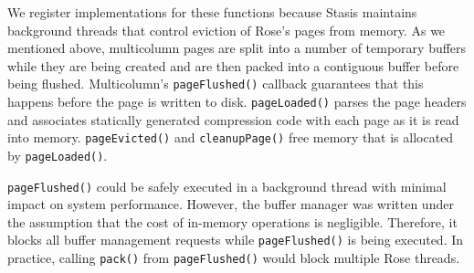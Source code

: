 \documentclass{vldb}
\newcommand{\rows}{Rose\xspace}
\newcommand{\rowss}{Rose's\xspace}
\begin{document}



We register implementations for these functions because
Stasis maintains background threads that control eviction
of \rowss pages from memory.  As we mentioned above, multicolumn pages
are split into a number of temporary buffers while they are being
created and are then packed into a contiguous buffer before being
flushed.  Multicolumn's {\tt pageFlushed()} callback guarantees
that this happens before the page is written to disk.  {\tt pageLoaded()}
parses the page headers and associates statically generated
compression code with each page as it is read into memory.
{\tt pageEvicted()} and {\tt cleanupPage()} free memory that is
allocated by {\tt pageLoaded()}.



{\tt pageFlushed()} could be safely executed in a background thread
with minimal impact on system performance.  However, the buffer
manager was written under the assumption that the cost of in-memory
operations is negligible.  Therefore, it blocks all buffer management
requests while {\tt pageFlushed()} is being executed.  In practice,
calling {\tt pack()} from {\tt pageFlushed()} would block multiple
\rows threads.
\end{document}
